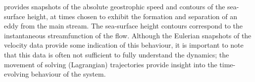  provides snapshots of the absolute geostrophic speed and contours of the sea-surface height, at times chosen to exhibit the formation and separation of an eddy from the main stream.
The sea-surface height contours correspond to the instantaneous streamfunction of the flow.
Although the Eulerian snapshots of the velocity data provide some indication of this behaviour, it is important to note that this data is often not sufficient to fully understand the dynamics; the movement of solving (Lagrangian) trajectories provide insight into the time-evolving behaviour of the system.


